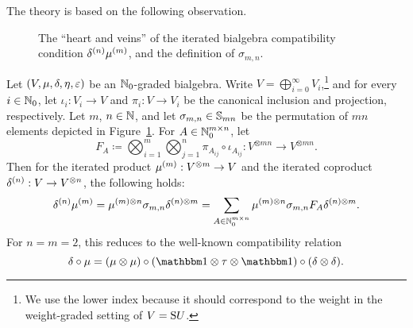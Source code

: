 \documentclass[\MainFolder/Text.tex]{subfiles}
\begin{document}
The theory is based on the following observation.
\begin{figure}[t]
\centering

\caption[The ``heart'' of the iterated bialgebra compatibility condition.]{The ``heart and veins'' of the iterated bialgebra compatibility condition $\delta^{(n)}\mu^{(m)}$, and the definition of $\sigma_{m,n}$.}
\label{Fig:Spider}
\end{figure}
\begin{Lemma}\label{Lem:ItCompCond}
Let $(V, \mu, \delta, \eta, \varepsilon)$ be an $\mathbb{N}_0$-graded bialgebra. Write $V = \bigoplus_{i=0}^\infty V_i$,\footnote{We use the lower index because it should correspond to the weight in the weight-graded setting of $V = \mathrm{S} U$.} and for every $i\in \mathbb{N}_0$, let $\iota_i : V_i \rightarrow V$ and $\pi_i: V \rightarrow V_i$ be the canonical inclusion and projection, respectively. Let $m$, $n\in \mathbb{N}$, and let $\sigma_{m,n}\in \mathbb{S}_{m n}$ be the permutation of $mn$ elements depicted in Figure~\ref{Fig:Spider}. For $A\in \mathbb{N}_0^{m\times n}$, let
\[ F_{A}\coloneqq \bigotimes_{i=1}^m \bigotimes_{j=1}^n \pi_{A_{ij}}\circ \iota_{A_{ij}} : V^{\otimes m n } \longrightarrow V^{\otimes m n}. \]
Then for the iterated product $\mu^{(m)}: V^{\otimes m} \rightarrow V$ and the iterated coproduct $\delta^{(n)}: V\rightarrow V^{\otimes n}$, the following holds:
\begin{equation}\label{Eq:ItCompRel}
\delta^{(n)}\mu^{(m)} = \mu^{(m)\otimes n} \sigma_{m,n} \delta^{(n)\otimes m} =  \sum_{A\in \mathbb{N}_0^{m\times n}} \mu^{(m)\otimes n} \sigma_{m,n}F_A \delta^{(n)\otimes m}.
\end{equation}
For $n=m=2$, this reduces to the well-known compatibility relation
\begin{equation}\label{Eq:BasicCompCond}
\MVCoProd\circ \MVProd = (\MVProd\otimes\MVProd)\circ (\Id\otimes\tau\otimes\Id)\circ(\MVCoProd\otimes\MVCoProd).
\end{equation}
\end{Lemma}
\end{document}
